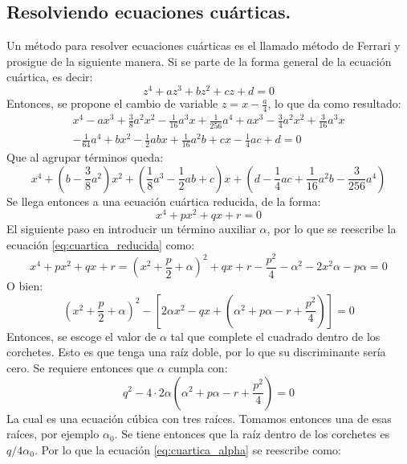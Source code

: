 \documentclass[12pt]{article}
\begin{document}
\subsection*{Resolviendo ecuaciones cuárticas.}
Un método para resolver ecuaciones cuárticas es el llamado método de Ferrari \cite{higheralgebra} y prosigue de la siguiente manera. Si se parte de la forma general de la ecuación cuártica, es decir:
\begin{equation}
z^4 +az^3+bz^2+cz+d=0
\label{eq:general_cuartica}
\end{equation}
Entonces, se propone el cambio de variable $z=x-\frac{a}{4}$, lo que da como resultado:
\begin{multline}
x^4-ax^3+\frac{3}{8}a^2x^2-\frac{1}{16}a^3x+\frac{1}{256}a^4 +ax^3 - \frac{3}{4}a^2x^2 + \frac{3}{16}a^3x \\
-\frac{1}{64}a^4 + bx^2 -\frac{1}{2}abx+ \frac{1}{16}a^2b + cx -\frac{1}{4}ac +d =0
\end{multline}
Que al agrupar términos queda:
\begin{equation}
x^4+\left(b-\frac{3}{8}a^2\right)x^2 + \left(\frac{1}{8}a^3-\frac{1}{2}ab +c\right)x+ \left(d-\frac{1}{4}ac +\frac{1}{16}a^2b-\frac{3}{256}a^4\right)
\end{equation}
Se llega entonces a una ecuación cuártica reducida, de la forma:
\begin{equation}
x^4 +px^2+qx+r=0
\label{eq:cuartica_reducida}
\end{equation}
El siguiente paso en introducir un término auxiliar $\alpha$, por lo que se reescribe la ecuación \ref{eq:cuartica_reducida} como:
\begin{equation}
x^4 +px^2+qx+r=\left(x^2 +\frac{p}{2}+\alpha\right)^2 +qx+r -\frac{p^2}{4}-\alpha^2 -2x^2\alpha -p\alpha=0
\end{equation}
O bien:
\begin{equation}
\label{eq:cuartica_alpha}
\left(x^2 +\frac{p}{2}+\alpha\right)^2 - \left[2\alpha x^2 -qx + \left(\alpha^2 +p\alpha-r +\frac{p^2}{4}\right)\right]=0
\end{equation}
Entonces, se escoge el valor de $\alpha$ tal que complete el cuadrado dentro de los corchetes. Esto es que tenga una raíz doble, por lo que su discriminante sería cero. Se requiere entonces que $\alpha$ cumpla con:
\begin{equation}
\label{eq:discriminante_cuartica_reducida}
q^2 -4 \cdot 2\alpha \left(\alpha^2 +p\alpha-r +\frac{p^2}{4}\right)=0
\end{equation}
La cual es una ecuación cúbica con tres raíces. Tomamos entonces una de esas raíces, por ejemplo $\alpha_0$. Se tiene entonces que la raíz dentro de los corchetes es $q/4\alpha_0$. Por lo que la ecuación \ref{eq:cuartica_alpha} se reescribe como:
\end{document}
